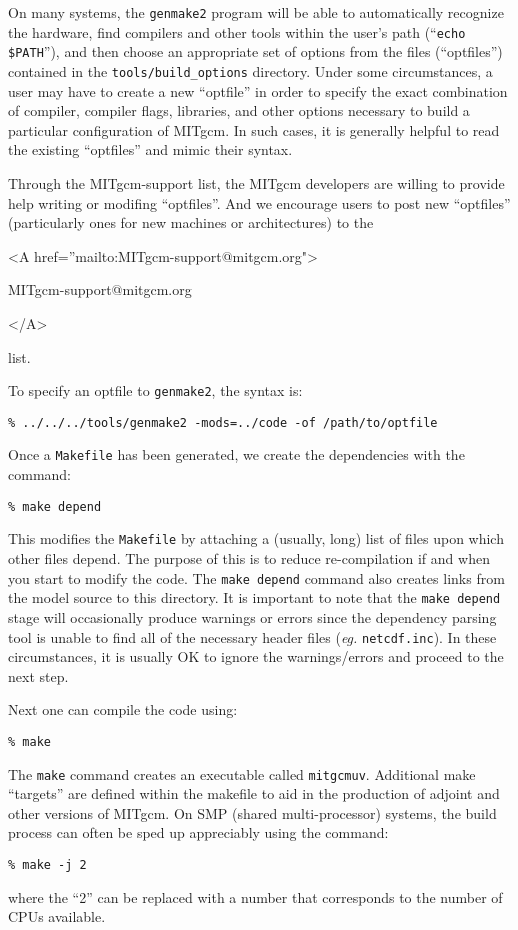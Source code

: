 On many systems, the \texttt{genmake2} program will be able to
automatically recognize the hardware, find compilers and other tools
within the user's path (``\texttt{echo \$PATH}''), and then choose an
appropriate set of options from the files (``optfiles'') contained in
the \texttt{tools/build\_options} directory.  Under some
circumstances, a user may have to create a new ``optfile'' in order to
specify the exact combination of compiler, compiler flags, libraries,
and other options necessary to build a particular configuration of
MITgcm.  In such cases, it is generally helpful to read the existing
``optfiles'' and mimic their syntax.

Through the MITgcm-support list, the MITgcm developers are willing to
provide help writing or modifing ``optfiles''.  And we encourage users
to post new ``optfiles'' (particularly ones for new machines or
architectures) to the 
\begin{rawhtml} <A href=''mailto:MITgcm-support@mitgcm.org"> \end{rawhtml}
MITgcm-support@mitgcm.org
\begin{rawhtml} </A> \end{rawhtml}
list.

To specify an optfile to \texttt{genmake2}, the syntax is:
\begin{verbatim}
% ../../../tools/genmake2 -mods=../code -of /path/to/optfile
\end{verbatim}

Once a \texttt{Makefile} has been generated, we create the
dependencies with the command:
\begin{verbatim}
% make depend
\end{verbatim}
This modifies the \texttt{Makefile} by attaching a (usually, long)
list of files upon which other files depend. The purpose of this is to
reduce re-compilation if and when you start to modify the code. The
{\tt make depend} command also creates links from the model source to
this directory.  It is important to note that the {\tt make depend}
stage will occasionally produce warnings or errors since the
dependency parsing tool is unable to find all of the necessary header
files (\textit{eg.}  \texttt{netcdf.inc}).  In these circumstances, it
is usually OK to ignore the warnings/errors and proceed to the next
step.

Next one can compile the code using:
\begin{verbatim}
% make
\end{verbatim}
The {\tt make} command creates an executable called \texttt{mitgcmuv}.
Additional make ``targets'' are defined within the makefile to aid in
the production of adjoint and other versions of MITgcm.  On SMP
(shared multi-processor) systems, the build process can often be sped
up appreciably using the command:
\begin{verbatim}
% make -j 2
\end{verbatim}
where the ``2'' can be replaced with a number that corresponds to the
number of CPUs available.

